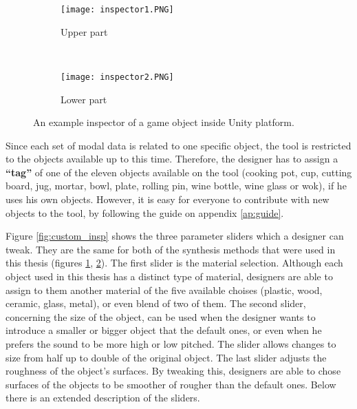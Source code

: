 \begin{figure}[H]
    \centering
    \begin{subfigure}[b]{0.45\textwidth}
        \texttt{[image: inspector1.PNG]}
        \caption{Upper part}
        \label{fig:FB}
    \end{subfigure}
    ~ %
    \begin{subfigure}[b]{0.45\textwidth}
        \texttt{[image: inspector2.PNG]}
        \caption{Lower part}
        \label{fig:sin}
    \end{subfigure}
    \caption{An example inspector of a game object inside Unity\textsuperscript{\textregistered} platform.}\label{fig:audio_insp}
\end{figure}

Since each set of modal data is related to one specific object, the tool is restricted to the objects available up to this time. Therefore, the designer has to assign a \textbf{``tag''} of one of the eleven objects available on the tool (cooking pot, cup, cutting board, jug, mortar, bowl, plate, rolling pin, wine bottle, wine glass or wok), if he uses his own objects. However, it is easy for everyone to contribute with new objects to the tool, by following the guide on appendix \ref{ap:guide}.

Figure \ref{fig:custom_insp} shows the three parameter sliders which a designer can tweak. They are the same for both of the synthesis methods that were used in this thesis (figures \ref{fig:FB}, \ref{fig:sin}). The first slider is the material selection. Although each object used in this thesis has a distinct type of material, designers are able to assign to them another material of the five available choises (plastic, wood, ceramic, glass, metal), or even blend of two of them. The second slider, concerning the size of the object, can be used when the designer wants to introduce a smaller or bigger object that the default ones, or even when he prefers the sound to be more high or low pitched. The slider allows changes to size from half up to double of the original object. The last slider adjusts the roughness of the object's surfaces. By tweaking this, designers are able to chose surfaces of the objects to be smoother of rougher than the default ones. Below there is an extended description of the sliders.

